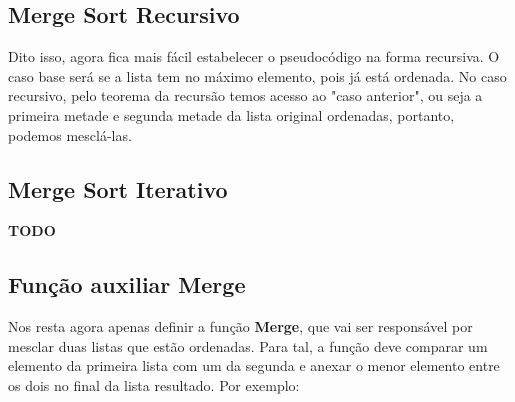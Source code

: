 \FloatBarrier

\newpage

\subsection{Merge Sort Recursivo}

Dito isso, agora fica mais fácil estabelecer o pseudocódigo na forma recursiva. O caso base será se a lista tem no máximo elemento, pois já está ordenada. No caso recursivo, pelo teorema da recursão temos acesso ao "caso anterior", ou seja a primeira metade e segunda metade da lista original ordenadas, portanto, podemos mesclá-las.

\begin{algorithm}
	\label{algo:merge_sort_pseudo}
	\begin{algorithmic}[1]
		 \Return
		\EndIf
		\State {}
		\EndFunction
	\end{algorithmic}
\end{algorithm}

\FloatBarrier

\subsection{Merge Sort Iterativo}

\textbf{TODO}

\subsection{Função auxiliar Merge}

\noindent
Nos resta agora apenas definir a função \textbf{Merge}, que vai ser responsável por mesclar duas listas que estão ordenadas. Para tal, a função deve comparar um elemento da primeira lista com um da segunda e anexar o menor elemento entre os dois no final da lista resultado. Por exemplo:

